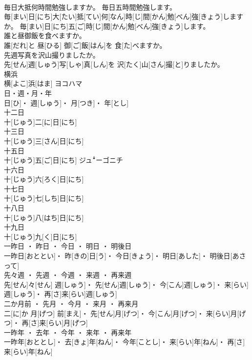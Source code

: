 \documentclass[8pt]{extreport}
\begin{document}
\begin{CJK}{UTF8}{min}
\\	毎日大抵何時間勉強しますか。 毎日五時間勉強します。	
\\	毎[まい]日[にち]大[たい]抵[てい]何[なん]時[じ]間[かん]勉[べん]強[きょう]しますか。 毎[まい]日[にち]五[ご]時[じ]間[かん]勉[べん]強[きょう]します。
\\	誰と昼御飯を食べますか。	
\\	誰[だれ]と 昼[ひる] 御[ご]飯[はん]を 食[た]べますか。
\\	先週写真を沢山撮りましたか。	
\\	先[せん]週[しゅう]写[しゃ]真[しん]を 沢[たく]山[さん]撮[と]りましたか。
\\	横浜	
\\	横[よこ]浜[はま]	ヨコハマ
\\	日・週・月・年	
\\	日[ひ]・ 週[しゅう]・ 月[つき]・ 年[とし]	
\\	十二日	
\\	十[じゅう]二[に]日[にち]	
\\	十三日	
\\	十[じゅう]三[さん]日[にち]	
\\	十五日	
\\	十[じゅう]五[ご]日[にち]	ジュꜜーゴニチ
\\	十六日	
\\	十[じゅう]六[ろく]日[にち]	
\\	十七日	
\\	十[じゅう]七[しち]日[にち]	
\\	十八日	
\\	十[じゅう]八[はち]日[にち]	
\\	十九日	
\\	十[じゅう]九[く]日[にち]	
\\	一昨日 ・ 昨日 ・ 今日 ・ 明日 ・ 明後日	
\\	一昨日[おととい]・ 昨[きの]日[う]・ 今日[きょう]・ 明日[あした]・ 明後日[あさって]
\\	先々週 ・ 先週 ・ 今週 ・ 来週 ・ 再来週	
\\	先[せん]々[せん] 週[しゅう]・ 先[せん]週[しゅう]・ 今[こん]週[しゅう]・ 来[らい]週[しゅう]・ 再[さ]来[らい]週[しゅう]	
\\	二か月前 ・ 先月 ・ 今月 ・ 来月 ・ 再来月	
\\	二[に]か 月[げつ] 前[まえ]・ 先[せん]月[げつ]・ 今[こん]月[げつ]・ 来[らい]月[げつ]・ 再[さ]来[らい]月[げつ]
\\	一昨年 ・ 去年 ・ 今年 ・ 来年 ・ 再来年	
\\	一昨年[おととし]・ 去[きょ]年[ねん]・ 今年[ことし]・ 来[らい]年[ねん]・ 再[さ]来[らい]年[ねん]

\end{CJK}
\end{document}
